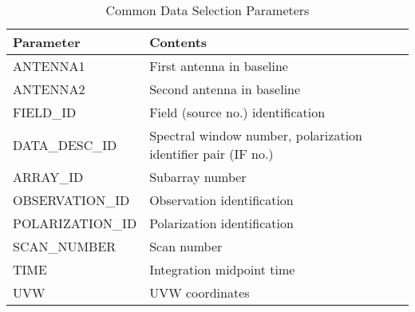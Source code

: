 \vspace{5mm}
\begin{table}[h!]
\caption[Common Data Selection Parameters]
        {\label{tabselect} Common Data Selection Parameters}
\begin{center}
\begin{tabular}{|ll|} \hline
{\bf Parameter}   &   {\bf Contents}                  \\
\hline
\hline
ANTENNA1      &   First antenna in baseline   \\
ANTENNA2      &   Second antenna in baseline  \\
FIELD\_ID      &   Field (source no.) identification  \\
DATA\_DESC\_ID  &   Spectral window number, polarization identifier pair (IF no.)  \\
ARRAY\_ID      &   Subarray number                \\
OBSERVATION\_ID  &   Observation identification   \\
POLARIZATION\_ID  &   Polarization identification \\ 
SCAN\_NUMBER   &   Scan number                    \\
TIME          &   Integration midpoint time      \\
UVW           &   UVW coordinates                \\
\hline
\end{tabular}
\end{center}
\end{table}

